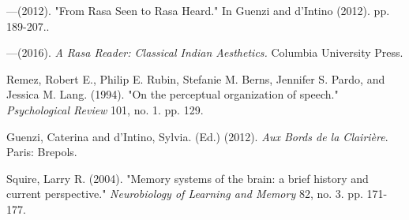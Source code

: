 \begin{thebibliography}{99}
---\kern3pt(2012). "From Rasa Seen to Rasa Heard." In Guenzi and d’Intino (2012). pp. 189-207..

---\kern3pt(2016). \textsl{A Rasa Reader: Classical Indian Aesthetics.} Columbia University Press.

Remez, Robert E., Philip E. Rubin, Stefanie M. Berns, Jennifer S. Pardo, and Jessica M. Lang. (1994). "On the perceptual organization of speech." \textsl{Psychological Review} 101, no. 1. pp. 129.

Guenzi, Caterina and d'Intino, Sylvia. (Ed.) (2012). \textsl{Aux Bords de la Clairière}. Paris: Brepols.

Squire, Larry R. (2004). "Memory systems of the brain: a brief history and current perspective." \textsl{Neurobiology of Learning and Memory} 82, no. 3. pp. 171-177.
\end{thebibliography}

